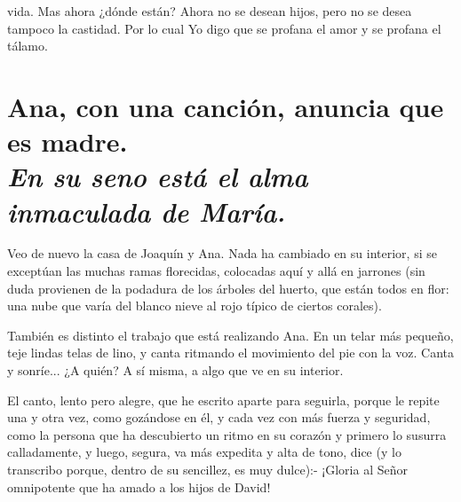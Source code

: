 \documentclass[12pt]{book} %
\begin{document}
vida. Mas ahora ¿dónde están? Ahora no se desean hijos, pero no se desea tampoco la castidad. Por lo cual Yo digo que se profana el amor y se profana el tálamo. 

\chapter*{Ana, con una canción, anuncia que es madre. \\ \normalfont\normalsize\textit{En su seno está el alma inmaculada de María.}}
 
Veo de nuevo la casa de Joaquín y Ana. Nada ha cambiado en su interior, si se exceptúan las muchas ramas florecidas, colocadas aquí y allá en jarrones (sin duda provienen de la podadura de los árboles del huerto, que están todos en flor: una nube que varía del blanco nieve al rojo típico de ciertos corales). 

También es distinto el trabajo que está realizando Ana. En un telar más pequeño, teje lindas telas de lino, y canta ritmando el movimiento del pie con la voz. Canta y sonríe... ¿A quién? A sí misma, a algo que ve en su interior. 

El canto, lento pero alegre, que he escrito aparte para seguirla, porque le repite una y otra vez, como gozándose en él, y cada vez con más fuerza y seguridad, como la persona que ha descubierto un ritmo en su corazón y primero lo susurra calladamente, y luego, segura, va más expedita y alta de tono, dice (y lo transcribo porque, dentro de su sencillez, es muy dulce):- ¡Gloria al Señor omnipotente que ha amado a los hijos de David! 
\end{document}
